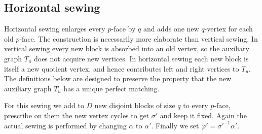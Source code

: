 \documentclass[11pt]{article}
\theoremstyle{remark}
\begin{document}
\subsection{Horizontal sewing}

Horizontal sewing enlarges every $p$-face by $q$ and adds one new
$q$-vertex for each old $p$-face.  The construction is necessarily more
elaborate than vertical sewing.  In vertical sewing every new block is
absorbed into an old vertex, so the auxiliary graph $T_u$ does not acquire
new vertices.  In horizontal sewing each new block is itself a new quotient
vertex, and hence contributes left and right vertices to
$T_u$.  The definitions below are designed to preserve the property that the new auxiliary graph $T_u$ has a unique perfect matching. 

For this sewing we add to $D$ new disjoint blocks of size $q$ to every $p$-face, prescribe on them the new vertex cycles to get $\sigma'$ and keep it fixed. Again the actual sewing is performed by changing $\alpha$ to $\alpha'$. Finally we set $\varphi'=\sigma'^{-1}\alpha'$. %
\end{document}
